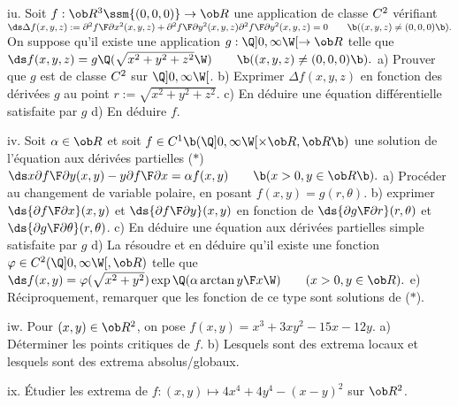 \exo [Level=2,Fight=2,Learn=2,Type=\TravauxDirigés,Field=\EquationsAuxDérivéesPartielles,Origin=] iu. 
Soit $f:\ob R^3\ssm\{(0,0,0)\}\to\ob R$ une application de classe $\sc C^2$ 
vérifiant 
\medskip\hfill$\ds 
\Delta f(x,y,z):={\partial^2f\F\partial x^2}(x,y,z)
+{\partial^2f\F\partial y^2}(x,y,z){\partial^2f\F\partial y^2}(x,y,z)=0\qquad\b((x,y,z)\neq(0,0,0)\b). 
$\hfill\null\medskip\noindent
On suppose qu'il existe une application $g:\Q]0,\infty\W[\to\ob R$ telle que 
\medskip\hfill$\ds 
f(x,y,z)=g\Q(\sqrt{x^2+y^2+z^2}\W)\qquad\b((x,y,z)\neq(0,0,0)\b).
$\hfill\null\medskip\noindent
a) Prouver que $g$ est de classe $\sc C^2$ sur $\Q]0,\infty\W[$. \smallskip
\noindent
b) Exprimer $\Delta f(x,y,z)$ en fonction des dérivées $g$ au point $r:=\sqrt{x^2+y^2+z^2}$. 
\smallskip\noindent 
c) En déduire une équation différentielle satisfaite par $g$
\smallskip\noindent
d) En déduire $f$. 

\exo [Level=2,Fight=2,Learn=2,Type=\TravauxDirigés,Field=\EquationsAuxDérivéesPartielles,Origin=] iv. 
Soit $\alpha\in\ob R$ et soit $f\in\sc C^1\b(\Q]0,\infty\W[\times\ob R,\ob R\b)$ une solution 
de l'équation aux dérivées partielles 
\medskip\noindent($*$)\hfill$\ds 
x{\partial f\F\partial y}(x,y)-y{\partial f\F\partial x}=\alpha f(x,y)\qquad\b(x>0,y\in\ob R\b).
$\hfill\null\medskip\noindent 
a) Procéder au changement de variable polaire, en posant $f(x,y)=g(r,\theta)$. 
\medskip\noindent
b) exprimer $\ds{\partial f\F\partial x}(x,y)$ et $\ds{\partial f\F\partial y}(x,y)$ en fonction de 
$\ds{\partial g\F\partial r}(r,\theta)$ et $\ds{\partial g\F\partial\theta}(r,\theta)$. 
\medskip\noindent
c) En déduire une équation aux dérivées partielles simple satisfaite par $g$
\medskip\noindent
d) La résoudre et en déduire qu'il existe 
une fonction $\varphi\in\sc C^2(\Q]0,\infty\W[,\ob R)$ telle que 
\medskip\hfill$\ds 
f(x,y)=\varphi(\sqrt{x^2+y^2})\exp\Q(\alpha\arctan{y\F x}\W)\qquad(x>0,y\in\ob R). 
$\hfill\null\medskip\noindent 
e) Réciproquement, remarquer que les fonction de ce type sont solutions de ($*$). 

\exo [Level=2,Fight=1,Learn=1,Type=\Exercices,Field=\Extrema,Origin=] iw. 
Pour $(x,y)\in\ob R^2$, on pose $f(x,y)=x^3+3xy^2-15x-12y$. \pn
a) Déterminer les points critiques de $f$. \pn
b) Lesquels sont des extrema locaux et lesquels 
sont des extrema absolus/globaux. 

\exo [Level=2,Fight=1,Learn=1,Type=\Exercices,Field=\Extrema,Origin=] ix. 
Étudier les extrema de $f:(x,y)\mapsto 4x^4+4y^4-(x-y)^2$ sur $\ob R^2$. 

